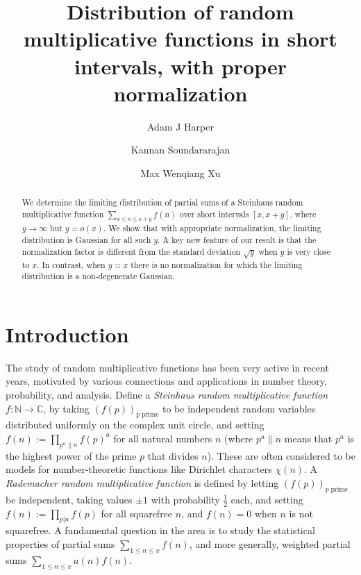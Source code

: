 \documentclass[12pt, notitlepage]{amsart}
\numberwithin{equation}{section}
\def\C{\mathbb C}
\def\N{\mathbb N}
\theoremstyle{remark}
\theoremstyle{definition}
\theoremstyle{remark}
\numberwithin{equation}{section}
\begin{document}
	\title[Distribution of random multiplicative functions in short intervals]{Distribution of random multiplicative functions in short intervals, with proper normalization }
	\author{Adam J Harper}
	\address{Mathematics Institute, Zeeman Building, University of Warwick, Coventry CV4
7AL, England}
	\author{Kannan Soundararajan}
	\address{Department of Mathematics, Stanford University, Stanford, CA, USA}
\author{Max Wenqiang Xu} 
\address{Yau Mathematical Sciences Center, Tsinghua University, Beijing, China}

	\begin{abstract}
 We determine the limiting distribution of partial sums of a Steinhaus random multiplicative function $\sum_{x\le n \le x+y} f(n)$ over short intervals $[x, x+y]$, where $y \rightarrow \infty$ but $y=o(x)$. We show that with appropriate normalization, the limiting distribution is Gaussian for all such $y$. A key new feature of our result is that the normalization factor is different from the standard deviation $\sqrt{y}$ when $y$ is very close to $x$. In contrast, when $y \asymp x$ there is no normalization for which the limiting distribution is a non-degenerate Gaussian.
	\end{abstract}
	\maketitle

 \section{Introduction}
 The study of random multiplicative functions has been very active in recent years, motivated by various connections and applications in number theory, probability, and analysis. Define a {\em Steinhaus random multiplicative function} $f : \N \rightarrow \C$, by taking $(f(p))_{p \; \text{prime}}$ to be independent random variables distributed uniformly on the complex unit circle, and setting $f(n) := \prod_{p^{a}\| n} f(p)^{a}$ for all natural numbers $n$ (where $p^a \| n$ means that $p^a$ is the highest power of the prime $p$ that divides $n$). These are often considered to be models for number-theoretic functions like Dirichlet characters $\chi(n)$.  A {\em Rademacher random multiplicative function} is defined by letting $(f(p))_{p \; \text{prime}}$ be independent, taking values $\pm 1$ with probability $\frac 12$ each, and setting $f(n) := \prod_{p |n} f(p)$ for all squarefree $n$, and $f(n) = 0$ when $n$ is not squarefree.  A fundamental question in the area is to study the statistical properties of partial sums $\sum_{1\le n \le x}f(n)$, and more generally, weighted partial sums $\sum_{1\le n \le x} a(n)f(n)$. 
\end{document}
